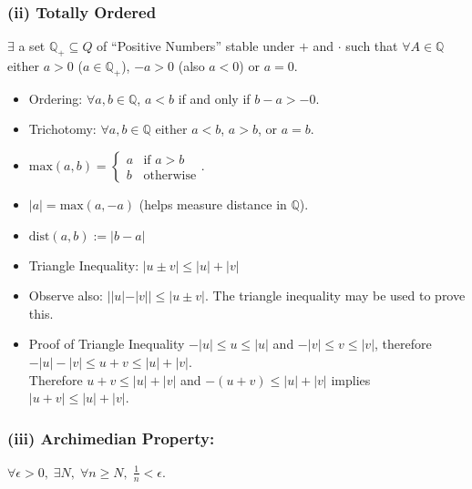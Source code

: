 \documentclass[11pt]{article}
\newcommand{\0}{\emptyset}
\newcommand{\Q}{\mathbb{Q}}
\begin{document}
\subsubsection*{(ii) Totally Ordered}
\label{sec:orge13c458}
\(\exists\) a set \(\Q_{+}\subseteq Q\) of ``Positive Numbers'' stable under \(+\) and \(\cdot\) such that \(\forall A\in\Q\) either \(a>0\) (\(a\in\Q_{+}\)), \(-a>0\) (also \(a<0\)) or \(a=0\).\\[0pt]
\begin{itemize}
\item Ordering: \(\forall a,b\in\Q\), \(a<b\) if and only if \(b-a>-0\).\\[0pt]
\item Trichotomy: \(\forall a,b\in\Q\) either \(a<b\), \(a>b\), or \(a=b\).\\[0pt]
\item \(\text{max}(a,b)=\begin{cases}a &\text{if } a>b \\ b &\text{otherwise}\end{cases}\).\\[0pt]
\item \(|a|=\text{max}(a,-a)\) (helps measure distance in \(\Q\)).\\[0pt]
\item \(\text{dist}(a,b):=|b-a|\)\\[0pt]
\item Triangle Inequality: \(|u\pm v|\leq|u|+|v|\)\\[0pt]
\item Observe also: \(||u|-|v||\leq|u\pm v|\). The triangle inequality may be used to prove this.\\[0pt]
\end{itemize}
\begin{itemize}
\item Proof of Triangle Inequality
\label{sec:orgeb399ad}
\(-|u|\leq u\leq|u|\) and \(-|v|\leq v\leq|v|\), therefore \(-|u|-|v|\leq u+v\leq |u|+|v|\).\\[0pt]
Therefore \(u+v\leq|u|+|v|\) and \(-(u+v)\leq |u|+|v|\) implies \(|u+v|\leq|u|+|v|\).\\[0pt]
\end{itemize}
\subsubsection*{(iii) Archimedian Property:}
\label{sec:orgb134e6b}
\(\forall\epsilon>0,\;\exists N,\;\forall n\geq N,\;\frac{1}{n}<\epsilon\).\\[0pt]
\end{document}
